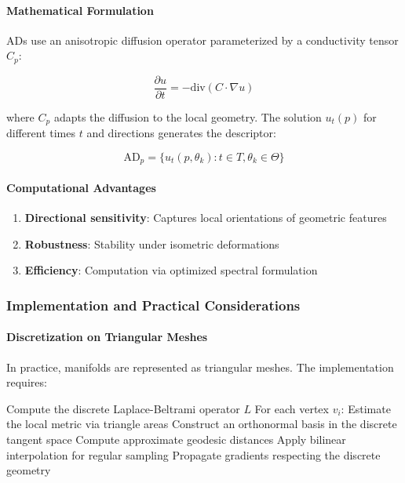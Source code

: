 \paragraph{Mathematical Formulation}

ADs use an anisotropic diffusion operator parameterized by a conductivity tensor $C_p$:

\begin{equation}
\frac{\partial u}{\partial t} = -\text{div}(C \cdot \nabla u)
\end{equation}

where $C_p$ adapts the diffusion to the local geometry. The solution $u_t(p)$ for different times $t$ and directions generates the descriptor:

\begin{equation}
\text{AD}_p = \{u_t(p, \theta_k) : t \in T, \theta_k \in \Theta\}
\end{equation}

\paragraph{Computational Advantages}

\begin{enumerate}
    \item \textbf{Directional sensitivity}: Captures local orientations of geometric features
    \item \textbf{Robustness}: Stability under isometric deformations
    \item \textbf{Efficiency}: Computation via optimized spectral formulation
\end{enumerate}

\subsubsection{Implementation and Practical Considerations}

\paragraph{Discretization on Triangular Meshes}

In practice, manifolds are represented as triangular meshes. The implementation requires:

\begin{algorithm}[H]
\caption{Geodesic CNN on a Triangular Mesh}
\begin{algorithmic}[1]
    \State Compute the discrete Laplace-Beltrami operator $L$
    \State For each vertex $v_i$:
    \State \quad Estimate the local metric via triangle areas
    \State \quad Construct an orthonormal basis in the discrete tangent space
    \State \quad Compute approximate geodesic distances
    \State \quad Apply bilinear interpolation for regular sampling
    \State Propagate gradients respecting the discrete geometry
\end{algorithmic}
\end{algorithm}


